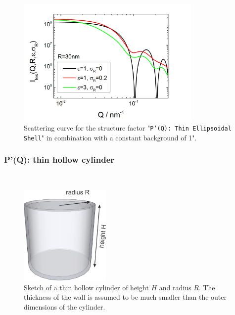 \begin{figure}[htb]
\begin{center}
\includegraphics[width=0.8\textwidth,height=0.55\textwidth]{../images/form_factor/anisotropic/PprimeThinEllShell.png}
\end{center}
\caption{Scattering curve for the structure factor "\texttt{P'(Q): Thin Ellipsoidal Shell}" in combination with a constant background of 1".}
\label{fig_IQ:PprimeThinEllShell}
\end{figure}

\clearpage
\subsubsection{P'(Q): thin hollow cylinder} ~\\
\label{plugin:Pprime4hollowcylinder}

\begin{figure}[htb]
\begin{center}
\includegraphics[width=0.3922\textwidth,height=0.4318\textwidth]{../images/form_factor/anisotropic/ThinHollowCylinder.png}
\end{center}
\caption{Sketch of a thin hollow cylinder of height $H$ and radius $R$. The thickness of the wall is assumed to be much smaller than the outer dimensions of the cylinder.}
\label{fig:ThinHollowCylinder}
\end{figure}

